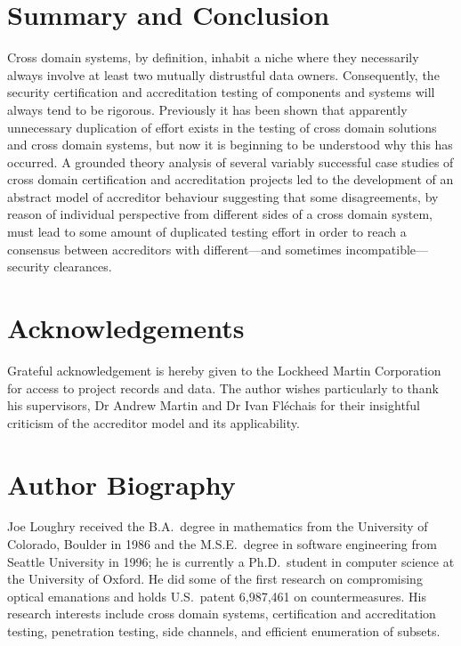 \documentclass[10pt,letterpaper,conference]{IEEEtran}
\begin{document}
\section{Summary and Conclusion}

Cross domain systems, by definition, inhabit a niche where they necessarily always involve at
least two mutually distrustful data owners. Consequently, the security certification and
accreditation testing of components and systems will always tend to be rigorous. Previously it has
been shown that apparently unnecessary duplication of effort exists in the testing of cross domain
solutions and cross domain systems, but now it is beginning to be understood why this has occurred.
A grounded theory analysis of several variably successful case studies of cross domain
certification and accreditation projects led to the development of an abstract model of accreditor
behaviour suggesting that some disagreements, by reason of individual perspective from different
sides of a cross domain system, must lead to some amount of duplicated testing effort in order to
reach a consensus between accreditors with different---and sometimes incompatible---security
clearances.

\section{Acknowledgements}

Grateful acknowledgement is hereby given to the Lockheed Martin Corporation for access to
project records and data. The author wishes particularly to thank his supervisors, Dr Andrew
Martin and Dr Ivan Fl\'{e}chais for their insightful criticism of the accreditor model and
its applicability.

\section{Author Biography}

Joe Loughry received the B.A.\ degree in mathematics from the University of Colorado,
Boulder in 1986 and the M.S.E.\ degree in software engineering from Seattle University
in 1996; he is currently a Ph.D.\ student in computer science at the University of Oxford.
He did some of the first research on compromising optical
emanations and holds U.S.\ patent 6,987,461 on countermeasures. His research interests
include cross domain systems, certification and accreditation testing,
penetration testing, side channels, and efficient enumeration of subsets.



\end{document}

